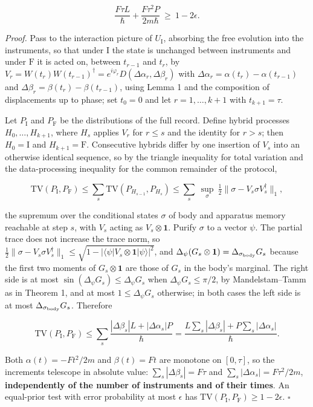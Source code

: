 \documentclass[11pt,a4paper]{article}
\begin{document}
\[\frac{F\tau L}{\hbar}+\frac{F\tau^2P}{2m\hbar}\ \ge\ 1-2\epsilon .\]

\emph{Proof.} Pass to the interaction picture of \(U_{\mathrm I}\),
absorbing the free evolution into the instruments, so that under
\(\mathrm I\) the state is unchanged between instruments and under
\(\mathrm F\) it is acted on, between \(t_{r-1}\) and \(t_r\), by
\(V_r=W(t_r)W(t_{r-1})^\dagger=e^{i\varphi_r}D(\Delta\alpha_r,\Delta\beta_r)\)
with \(\Delta\alpha_r=\alpha(t_r)-\alpha(t_{r-1})\) and
\(\Delta\beta_r=\beta(t_r)-\beta(t_{r-1})\), using Lemma 1 and the
composition of displacements up to phase; set \(t_0=0\) and let
\(r=1,\dots,k+1\) with \(t_{k+1}=\tau\).

Let \(P_{\mathrm I}\) and \(P_{\mathrm F}\) be the distributions of the
full record. Define hybrid processes \(H_0,\dots,H_{k+1}\), where
\(H_s\) applies \(V_r\) for \(r\le s\) and the identity for \(r>s\);
then \(H_0=\mathrm I\) and \(H_{k+1}=\mathrm F\). Consecutive hybrids
differ by one insertion of \(V_s\) into an otherwise identical sequence,
so by the triangle inequality for total variation and the
data-processing inequality for the common remainder of the protocol,

\[\mathrm{TV}(P_{\mathrm I},P_{\mathrm F})\le\sum_{s}
\mathrm{TV}(P_{H_{s-1}},P_{H_s})\le\sum_s\ \sup_{\sigma}\ \tfrac12\bigl\|\sigma-V_s\sigma V_s^\dagger\bigr\|_1,\]

the supremum over the conditional states \(\sigma\) of body and
apparatus memory reachable at step \(s\), with \(V_s\) acting as
\(V_s\otimes\mathbf 1\). Purify \(\sigma\) to a vector \(\psi\). The
partial trace does not increase the trace norm, so
\(\tfrac12\|\sigma-V_s\sigma V_s^\dagger\|_1\le\sqrt{1-|\langle\psi|V_s\otimes\mathbf 1|\psi\rangle|^2}\),
and \(\Delta_\psi(G_s\otimes\mathbf 1)=\Delta_{\sigma_{\rm body}}G_s\)
because the first two moments of \(G_s\otimes\mathbf 1\) are those of
\(G_s\) in the body's marginal. The right side is at most
\(\sin(\Delta_\psi G_s)\le\Delta_\psi G_s\) when
\(\Delta_\psi G_s\le\pi/2\), by Mandelstam--Tamm as in Theorem 1, and at
most \(1\le\Delta_\psi G_s\) otherwise; in both cases the left side is
at most \(\Delta_{\sigma_{\rm body}}G_s\). Therefore

\[\mathrm{TV}(P_{\mathrm I},P_{\mathrm F})\le\sum_s
\frac{|\Delta\beta_s|L+|\Delta\alpha_s|P}{\hbar}
=\frac{L\sum_s|\Delta\beta_s|+P\sum_s|\Delta\alpha_s|}{\hbar}.\]

Both \(\alpha(t)=-Ft^2/2m\) and \(\beta(t)=Ft\) are monotone on
\([0,\tau]\), so the increments telescope in absolute value:
\(\sum_s|\Delta\beta_s|=F\tau\) and
\(\sum_s|\Delta\alpha_s|=F\tau^2/2m\), \textbf{independently of the
number of instruments and of their times}. An equal-prior test with
error probability at most \(\epsilon\) has
\(\mathrm{TV}(P_{\mathrm I},P_{\mathrm F})\ge1-2\epsilon\). \(\square\)
\end{document}

